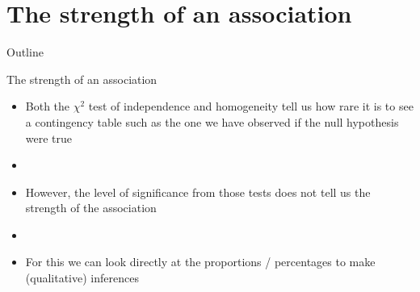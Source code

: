 \documentclass[xcolor=dvipsnames]{beamer}
\begin{document}
\section{The strength of an association}
\begin{frame}{Outline}
\tableofcontents[currentsection,subsectionstyle=show/shaded/hide]
\end{frame}

\begin{frame}{The strength of an association}
	\begin{itemize}
		\item Both the $\chi^2$ test of independence and homogeneity tell us how rare it is to see a contingency table such as the one we have observed if the null hypothesis were true
		\item[]
		\item However, the level of significance from those tests does not tell us the strength of the association
		\item[]
		\item For this we can look directly at the proportions / percentages to make (qualitative) inferences
	\end{itemize}
\end{frame}
\end{document}
